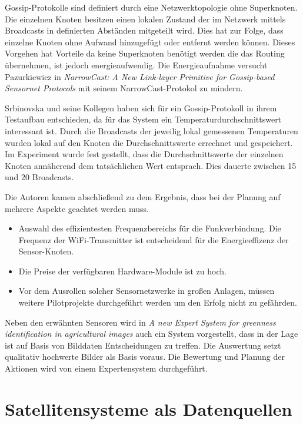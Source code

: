 Gossip-Protokolle sind definiert durch eine Netzwerktopologie ohne Superknoten. Die einzelnen Knoten besitzen einen lokalen Zustand der im Netzwerk mittels Broadcasts in definierten Abständen mitgeteilt wird. Dies hat zur Folge, dass einzelne Knoten ohne Aufwand hinzugefügt oder entfernt werden können. Dieses Vorgehen hat Vorteile da keine Superknoten benötigt werden die das Routing übernehmen, ist jedoch energieaufwendig. Die Energieaufnahme versucht Pazurkiewicz in \textit{NarrowCast: A New Link-layer Primitive for Gossip-based Sensornet Protocols} mit seinem NarrowCast-Protokol zu mindern.\cite{jour:Pazurkiewicz2014}

Srbinovska und seine Kollegen haben sich für ein Gossip-Protokoll in ihrem Testaufbau entschieden, da für das System ein Temperaturdurchschnittswert interessant ist. Durch die Broadcasts der jeweilig lokal gemessenen Temperaturen wurden lokal auf den Knoten die Durchschnittswerte errechnet und gespeichert. Im Experiment wurde fest gestellt, dass die Durchschnittswerte der einzelnen Knoten annäherend dem tatsächlichen Wert entsprach. Dies dauerte zwischen 15 und 20 Broadcasts.\cite{jour:Srbinovska2014}

Die Autoren kamen abschließend zu dem Ergebnis, dass bei der Planung auf mehrere Aspekte geachtet werden muss.\cite{jour:Srbinovska2014}
\begin{itemize}
	\item Auswahl des effizientesten Frequenzbereichs für die Funkverbindung. Die Frequenz der WiFi-Transmitter ist entscheidend für die Energieeffizenz der Sensor-Knoten.
	\item Die Preise der verfügbaren Hardware-Module ist zu hoch.
	\item Vor dem Ausrollen solcher Sensornetzwerke in großen Anlagen, müssen weitere Pilotprojekte durchgeführt werden um den Erfolg nicht zu gefährden.
\end{itemize}

Neben den erwähnten Sensoren wird in \textit{A new Expert System for greenness identification in agricultural images} auch ein System vorgestellt, dass in der Lage ist auf Basis von Bilddaten Entscheidungen zu treffen. Die Auswertung setzt qualitativ hochwerte Bilder als Basis voraus. Die Bewertung und Planung der Aktionen wird von einem Expertensystem durchgeführt.\cite{jour:Romeo2013}

\section{Satellitensysteme als Datenquellen}


